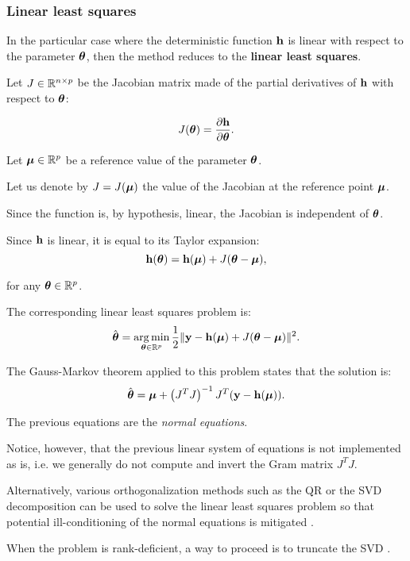\documentclass[aspectratio=169]{beamer}
\begin{document}

\begin{frame}
\frametitle{Linear least squares}

In the particular case where the deterministic function ${\bf h}$
is linear with respect to the parameter $\boldsymbol{\theta}$, then the
method reduces to the \textbf{linear least squares}. 

\vspace{15pt}

Let $J \in \mathbb{R}^{n \times p}$ be the Jacobian matrix made of the
partial derivatives of ${\bf h}$ with respect to
$\boldsymbol{\theta}$:

$$
J(\boldsymbol{\theta}) = \frac{\partial {\bf h}}{\partial \boldsymbol{\theta}}.
$$

\vspace{15pt}

Let $\boldsymbol{\mu} \in \mathbb{R}^p$ be a reference value of the
parameter $\boldsymbol{\theta}$. 

Let us denote by $J=J(\boldsymbol{\mu})$ the value of the Jacobian at the reference point
$\boldsymbol{\mu}$. 

Since the function is, by hypothesis, linear, the
Jacobian is independent of $\boldsymbol{\theta}$. 


\end{frame}


\begin{frame}
Since ${\bf h}$ is linear, it is equal to its Taylor expansion:
$$
{\bf h}(\boldsymbol{\theta}) = {\bf h}(\boldsymbol{\mu}) + J (\boldsymbol{\theta} - \boldsymbol{\mu}),
$$

for any $\boldsymbol{\theta} \in \mathbb{R}^p$.

The corresponding linear least squares problem is:
$$
\hat{\boldsymbol{\theta}} 
= \operatorname*{arg\,min}_{\boldsymbol{\theta} \in \mathbb{R}^p} \frac{1}{2} \|{\bf y} - {\bf h}(\boldsymbol{\mu}) + J (\boldsymbol{\theta} - \boldsymbol{\mu})\|^2.
$$

The Gauss-Markov theorem applied to this problem states that the
solution is:
$$
\hat{\boldsymbol{\theta}} = \boldsymbol{\mu} + \left(J^T J\right)^{-1} J^T ( {\bf y} - {\bf h}(\boldsymbol{\mu})).
$$

\end{frame}


\begin{frame}
The previous equations are the \emph{normal equations}. 

Notice, however, that the previous linear system of equations 
is not implemented as is, i.e.
we generally do not compute and invert the Gram matrix $J^T J$.

\vspace{30pt}

Alternatively, various orthogonalization methods such as the QR or the
SVD decomposition can be used to solve the linear least squares problem
so that potential ill-conditioning of the normal equations is
mitigated \cite{Bjorck1996}.

\vspace{15pt}

When the problem is rank-deficient, a way to proceed is to truncate 
the SVD \cite{Hansen00thelcurve}. 
\end{frame}
\end{document}
